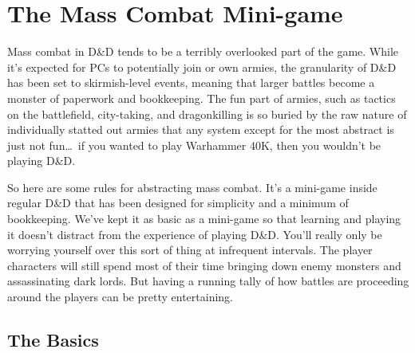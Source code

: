 
\section{The Mass Combat Mini-game}

Mass combat in D\&D tends to be a terribly overlooked part of the game. While it's expected for PCs to potentially join or own armies, the granularity of D\&D has been set to skirmish-level events, meaning that larger battles become a monster of paperwork and bookkeeping. The fun part of armies, such as tactics on the battlefield, city-taking, and dragonkilling is so buried by the raw nature of individually statted out armies that any system except for the most abstract is just not fun\ldots\ if you wanted to play Warhammer 40K, then you wouldn't be playing D\&D.

So here are some rules for abstracting mass combat. It's a mini-game inside regular D\&D that has been designed for simplicity and a minimum of bookkeeping. We've kept it as basic as a mini-game so that learning and playing it doesn't distract from the experience of playing D\&D. You'll really only be worrying yourself over this sort of thing at infrequent intervals. The player characters will still spend most of their time bringing down enemy monsters and assassinating dark lords. But having a running tally of how battles are proceeding around the players can be pretty entertaining.

\subsection{The Basics}





